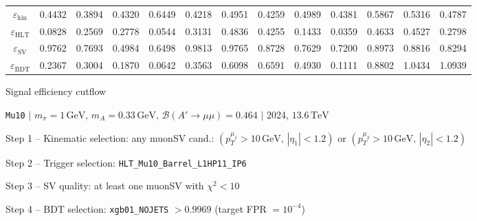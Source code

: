 \documentclass[10pt,a4paper]{article}
\begin{document}
\begin{landscape}
{\begin{tabular}{c|cccc|cccc|cccc}
\midrule
$\varepsilon_{\mathrm{kin}}$ & 0.4432 & 0.3894 & 0.4320 & 0.6449 & 0.4218 & 0.4951 & 0.4259 & 0.4989 & 0.4381 & 0.5867 & 0.5316 & 0.4787\\
$\varepsilon_{\mathrm{HLT}}$ & 0.0828 & 0.2569 & 0.2778 & 0.0544 & 0.3131 & 0.4836 & 0.4255 & 0.1433 & 0.0359 & 0.4633 & 0.4527 & 0.2798\\
$\varepsilon_{\mathrm{SV}}$ & 0.9762 & 0.7693 & 0.4984 & 0.6498 & 0.9813 & 0.9765 & 0.8728 & 0.7629 & 0.7200 & 0.8973 & 0.8816 & 0.8294\\
$\varepsilon_{\mathrm{BDT}}$ & 0.2367 & 0.3004 & 0.1870 & 0.0642 & 0.3563 & 0.6098 & 0.6591 & 0.4930 & 0.1111 & 0.8802 & 1.0434 & 1.0939\\
\bottomrule
\end{tabular}}

\end{landscape}
\clearpage

{\large Signal efficiency cutflow

 \texttt{Mu10} $|$ $m_{\pi}=1\,\mathrm{GeV}$, $m_{A}=0.33\,\mathrm{GeV}$, $\mathcal{B}(A'\!\to\!\mu\mu)=0.464$ $|$ 2024, $13.6\,\mathrm{TeV}$}

\vspace{0.8em}

Step 1 -- Kinematic selection: any muonSV cand.: $(p_T^{\mu_1}{>}10\,\mathrm{GeV},\,|\eta_1|{<}1.2)$ or $(p_T^{\mu_2}{>}10\,\mathrm{GeV},\,|\eta_2|{<}1.2)$

Step 2 -- Trigger selection: \texttt{HLT\_Mu10\_Barrel\_L1HP11\_IP6}

Step 3 -- SV quality: at least one muonSV with $\chi^2<10$

Step 4 -- BDT selection: \texttt{xgb01\_NOJETS} $>0.9969$ (target FPR $=10^{-4}$)

\vspace{0.8em}
\end{document}
